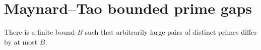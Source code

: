 \section{Maynard--Tao bounded prime gaps}

\begin{theorem}
\label{thm:maynard-tao}
\notready
There is a finite bound $B$ such that arbitrarily large pairs of distinct primes differ by at most $B$.
\end{theorem}
